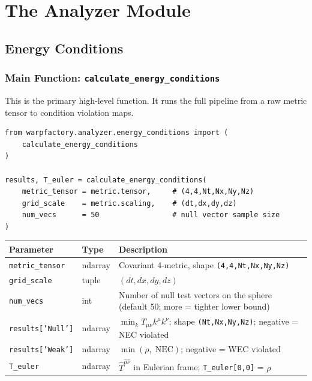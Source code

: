 \documentclass[11pt, a4paper, twoside]{report}
\begin{document}
\chapter{The Analyzer Module}
\label{chap:analyzer}

\section{Energy Conditions}
\label{sec:ec_api}

\subsection{Main Function: \texttt{calculate\_energy\_conditions}}

This is the primary high-level function.  It runs the full pipeline
from a raw metric tensor to condition violation maps.

\begin{lstlisting}[caption={Energy conditions — full pipeline}]
from warpfactory.analyzer.energy_conditions import (
    calculate_energy_conditions
)

results, T_euler = calculate_energy_conditions(
    metric_tensor = metric.tensor,     # (4,4,Nt,Nx,Ny,Nz)
    grid_scale    = metric.scaling,    # (dt,dx,dy,dz)
    num_vecs      = 50                 # null vector sample size
)
\end{lstlisting}

\begin{center}
\begin{tabularx}{\linewidth}{llX}
  \toprule
  Parameter        & Type    & Description \\
  \midrule
  \texttt{metric\_tensor} & ndarray & Covariant 4-metric, shape
                                    \texttt{(4,4,Nt,Nx,Ny,Nz)} \\
  \texttt{grid\_scale}    & tuple   & $(dt, dx, dy, dz)$ \\
  \texttt{num\_vecs}      & int     & Number of null test vectors on the
                                    sphere (default 50; more = tighter
                                    lower bound) \\
  \midrule
  \texttt{results['Null']} & ndarray & $\min_k T_{\mu\nu}k^\mu k^\nu$;
                                      shape \texttt{(Nt,Nx,Ny,Nz)};
                                      negative = NEC violated \\
  \texttt{results['Weak']} & ndarray & $\min(\rho,\;\text{NEC})$;
                                      negative = WEC violated \\
  \texttt{T\_euler}        & ndarray & $\hat{T}^{\hat\mu\hat\nu}$ in
                                      Eulerian frame;
                                      \texttt{T\_euler[0,0]} = $\rho$ \\
  \bottomrule
\end{tabularx}
\end{center}
\end{document}
